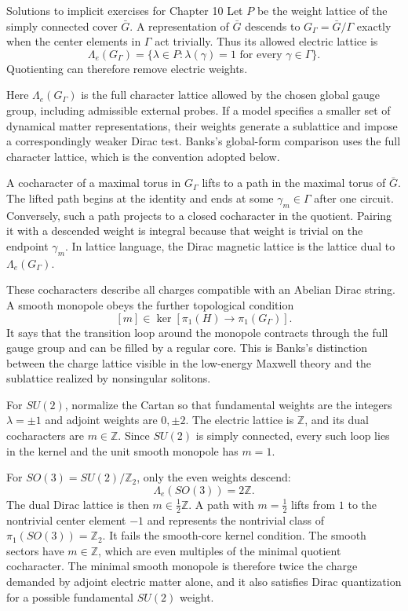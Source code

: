 \begin{bankssolutions}{Solutions to implicit exercises for Chapter 10}
Let $P$ be the weight lattice of the simply connected cover $\bar G$.  A
representation of $\bar G$ descends to $G_\Gamma=\bar G/\Gamma$ exactly when
the center elements in $\Gamma$ act trivially.  Thus its allowed electric
lattice is
\[
  \Lambda_e(G_\Gamma)
  =\{\lambda\in P:\lambda(\gamma)=1
    \text{ for every }\gamma\in\Gamma\}.
\]
Quotienting can therefore remove electric weights.

Here $\Lambda_e(G_\Gamma)$ is the full character lattice allowed by the
chosen global gauge group, including admissible external probes.  If a model
specifies a smaller set of dynamical matter representations, their weights
generate a sublattice and impose a correspondingly weaker Dirac test.  Banks's
global-form comparison uses the full character lattice, which is the convention
adopted below.

A cocharacter of a maximal torus in $G_\Gamma$ lifts to a path in the maximal
torus of $\bar G$.  The lifted path begins at the identity and ends at some
$\gamma_m\in\Gamma$ after one circuit.  Conversely, such a path projects to a
closed cocharacter in the quotient.  Pairing it with a descended weight is
integral because that weight is trivial on the endpoint $\gamma_m$.  In lattice
language, the Dirac magnetic lattice is the lattice dual to
$\Lambda_e(G_\Gamma)$.

These cocharacters describe all charges compatible with an Abelian Dirac
string.  A smooth monopole obeys the further topological condition
\[
  [m]\in\ker\!\left[\pi_1(H)\to\pi_1(G_\Gamma)\right].
\]
It says that the transition loop around the monopole contracts through the
full gauge group and can be filled by a regular core.  This is Banks's
distinction between the charge lattice visible in the low-energy Maxwell
theory and the sublattice realized by nonsingular solitons.

For $SU(2)$, normalize the Cartan so that fundamental weights are the integers
$\lambda=\pm1$ and adjoint weights are $0,\pm2$.  The electric lattice is
$\mathbb Z$, and its dual cocharacters are $m\in\mathbb Z$.  Since
$SU(2)$ is simply connected, every such loop lies in the kernel and the unit
smooth monopole has $m=1$.

For $SO(3)=SU(2)/\mathbb Z_2$, only the even weights descend:
\[
  \Lambda_e(SO(3))=2\mathbb Z.
\]
The dual Dirac lattice is then $m\in\tfrac12\mathbb Z$.  A path with
$m=\tfrac12$ lifts from $1$ to the nontrivial center element $-1$ and
represents the nontrivial class of $\pi_1(SO(3))=\mathbb Z_2$.  It fails the
smooth-core kernel condition.  The smooth sectors have $m\in\mathbb Z$, which
are even multiples of the minimal quotient cocharacter.  The minimal smooth
monopole is therefore twice the charge demanded by adjoint electric matter
alone, and it also satisfies Dirac quantization for a possible fundamental
$SU(2)$ weight.


\end{bankssolutions}
